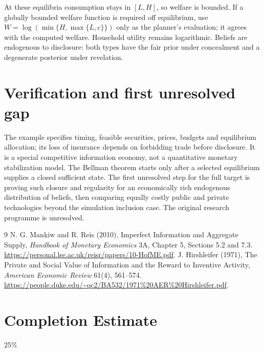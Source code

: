 \documentclass[11pt]{article}
\theoremstyle{remark}
\begin{document}
At these equilibria consumption stays in $[L,H]$, so welfare is bounded.
If a globally bounded welfare function is required off equilibrium, use
$W=\log(\min\{H,\max\{L,c\}\})$ only as the planner's evaluation;
it agrees with the computed welfare. Household utility remains logarithmic.
Beliefs are endogenous to disclosure: both types have the fair prior under
concealment and a degenerate posterior under revelation.

\section{Verification and first unresolved gap}
The example specifies timing, feasible securities, prices, budgets and
equilibrium allocation; its loss of insurance depends on forbidding trade
before disclosure. It is a special competitive information economy, not
a quantitative monetary stabilization model. The Bellman theorem starts
only after a selected equilibrium supplies a closed sufficient state.
The first unresolved step for the full target is proving such closure and
regularity for an economically rich endogenous distribution of beliefs,
then comparing equally costly public and private technologies beyond the
simulation inclusion case. The original research programme is unresolved.

\begin{thebibliography}{9}
 N. G. Mankiw and R. Reis (2010), Imperfect Information and
Aggregate Supply, \emph{Handbook of Monetary Economics} 3A, Chapter 5,
Sections 5.2 and 7.3. \url{https://personal.lse.ac.uk/reisr/papers/10-HofME.pdf}.
 J. Hirshleifer (1971), The Private and Social Value
of Information and the Reward to Inventive Activity,
\emph{American Economic Review} 61(4), 561--574.
\url{https://people.duke.edu/~qc2/BA532/1971%20AER%20Hirshleifer.pdf}.
\end{thebibliography}

\section{Completion Estimate}
25\%
\end{document}

